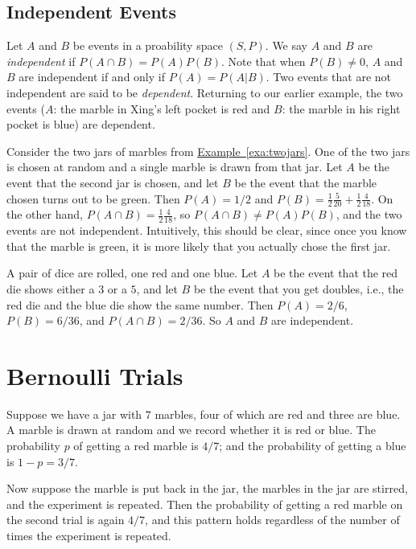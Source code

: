 \subsection{Independent Events}

Let $A$ and $B$ be events in a proability space $(S,P)$.  We say $A$
and $B$ are \textit{independent} if $P(A\cap B)=P(A)P(B)$.  Note that
when $P(B)\neq 0$, $A$ and $B$ are independent if and only if
$P(A)=P(A|B)$. Two events that are not independent are said to be
\emph{dependent}. Returning to our earlier example, the two events
($A$: the marble in Xing's left pocket is red and $B$: the marble in
his right pocket is blue) are dependent.

\begin{example}
  Consider the two jars of marbles from
  \hyperref[exa:twojars]{Example~\ref*{exa:twojars}}.  One of the two
  jars is chosen at random and a single marble is drawn from that jar.
  Let $A$ be the event that the second jar is chosen, and let $B$ be
  the event that the marble chosen turns out to be green.  Then
  $P(A)=1/2$ and $P(B)=\frac{1}{2}\frac{5}{20}+
  \frac{1}{2}\frac{4}{18}$.  On the other hand, $P(A\cap
  B)=\frac{1}{2} \frac{4}{18}$, so $P(A\cap B)\neq P(A)P(B)$, and the
  two events are not independent.  Intuitively, this should be clear,
  since once you know that the marble is green, it is more likely that
  you actually chose the first jar.
\end{example}

\begin{example}\label{exa:twodie}
A pair of dice are rolled, one red and one blue. Let $A$ be the event
that the red die shows either a $3$ or a $5$, and let $B$ be the event that you
get doubles, i.e., the red die and the blue die show the same number.
Then $P(A)=2/6$, $P(B)=6/36$, and $P(A\cap B) = 2/36$.  So $A$ and $B$
are independent. 
\end{example}

\section{Bernoulli Trials}\label{s:probability:bernoulli-trials}

Suppose we have a jar with $7$ marbles, four of which are red
and three are blue.  A marble is drawn at random and we record whether it
is red or blue.  The probability $p$ of getting a red marble
is $4/7$; and the probability of getting a blue is $1-p=3/7$.

Now suppose the marble is put back in the jar, the marbles in the
jar are stirred, and the experiment is repeated.  Then the probability
of getting a red marble on the second trial is again $4/7$, 
and this pattern holds regardless of the number of times the experiment 
is repeated.  

